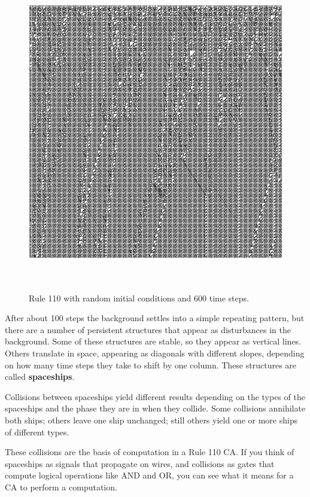 \documentclass[10pt]{book}
\begin{document}
\begin{figure}
\centerline{\includegraphics[width=5.5in,height=5.5in]{figs/rule-110-600-random.pdf}}
\caption{Rule 110 with random initial conditions and 600 time steps.\label{rule110}}
\end{figure}

After about 100 steps the background settles into a simple repeating
pattern, but there are a number of persistent structures that appear
as disturbances in the background.  Some of these structures
are stable, so they appear as vertical lines.  Others translate in
space, appearing as diagonals with different slopes, depending on
how many time steps they take to shift by one column.  These
structures are called {\bf spaceships}.

Collisions between spaceships yield different results
depending on the types of the spaceships and the phase they are in
when they collide.  Some collisions annihilate both ships; others
leave one ship unchanged; still others yield one or more ships of
different types.

These collisions are the basis of computation in a Rule 110 CA.  If
you think of spaceships as signals that propagate on wires, and
collisions as gates that compute logical operations like AND and OR,
you can see what it means for a CA to perform a computation.
\end{document}
